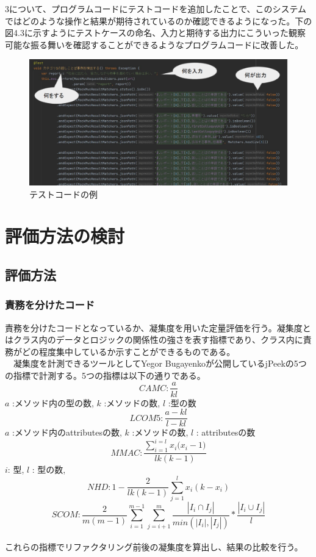 \documentclass[11pt, a4paper]{jreport}
\begin{document}
3について、プログラムコードにテストコードを追加したことで、このシステムではどのような操作と結果が期待されているのか確認できるようになった。下の図4.3に示すようにテストケースの命名、入力と期待する出力にこういった観察可能な振る舞いを確認することができるようなプログラムコードに改善した。
\begin{figure}[H]
\centering
\includegraphics[width=1\linewidth]{image/kaizen3.png}
\caption{テストコードの例}
\label{fig:enter-label}
\end{figure}
\chapter{評価方法の検討}
\section{評価方法}
\subsection{責務を分けたコード}
責務を分けたコードとなっているか、凝集度を用いた定量評価を行う。凝集度とはクラス内のデータとロジックの関係性の強さを表す指標であり、クラス内に責務がどの程度集中しているか示すことができるものである。
\\　凝集度を計測できるツールとしてYegor Bugayenkoが公開しているjPeekの5つの指標で計測する。5つの指標は以下の通りである。
\\
\begin{equation}
CAMC:
\frac{a}{kl}
\end{equation}
$a$ :メソッド内の型の数, $k$ :メソッドの数, $l$ :型の数
\begin{equation}
LCOM5:
\frac{a-kl}{l-kl}
\end{equation}
$a$ :メソッド内のattributesの数, $k$ :メソッドの数, $l$ : attributesの数
\begin{equation}
MMAC:
\frac{\sum^{i=l}_{i=1}{{x}_{i}{({x}_{i}-1})}}{lk(k-1)}
\end{equation}
$i$: 型, $l$ : 型の数,
\begin{equation}
NHD:
1-\frac{2}{lk(k-1)}\sum^{l}_{j=1}{x}_{i}{(k-{x}_{i})}
\end{equation}
\begin{equation}
SCOM:
\frac{2}{m(m-1)}\sum^{m-1}_{i=1}\sum^{m}_{j=i+1}\frac{|{I}_{i}\cap{I}_{j}|}{min(|{I}_{i}|,|{I}_{j}|)}*\frac{|{I}_{i}\cup{I}_{j}|}{l}
\end{equation}
\\これらの指標でリファクタリング前後の凝集度を算出し、結果の比較を行う。
\end{document}
